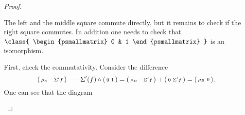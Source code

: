 \begin{proof}
\begin{enumerate}[label={(\bfseries TR\arabic*)}]
{\begin{center}
            \end{center}
            The left and the middle square commute directly, but it remains to check if the right square commutes. In addition one needs to check that \( \class{
                \begin{psmallmatrix}
                    0 & 1
                \end{psmallmatrix}
            } \) is an isomorphism.

            First, check the commutativity. Consider the difference
            \[
                \begin{psmallmatrix}
                    \rho_B & -\Sigma' f
                \end{psmallmatrix}
                -
                -\Sigma'(f) \circ
                \begin{psmallmatrix}
                    0 & 1
                \end{psmallmatrix}
                =
                \begin{psmallmatrix}
                    \rho_B & -\Sigma' f
                \end{psmallmatrix}
                +
                \begin{psmallmatrix}
                    0 & \Sigma' f
                \end{psmallmatrix}
                =
                \begin{psmallmatrix}
                    \rho_B & 0
                \end{psmallmatrix}.
            \]
            One can see that the diagram
            \begin{center}
\end{center}}
\end{enumerate}
\end{proof}

